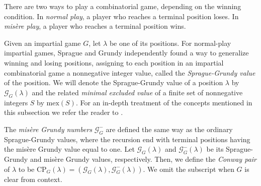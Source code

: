 \documentclass[pdflatex,sn-mathphys-num]{sn-jnl}%
\theoremstyle{thmstyleone}%
\theoremstyle{thmstyletwo}%
\theoremstyle{thmstylethree}%
\newcommand{\sg}{\mathcal{G}}
\newcommand{\cp}{\mathrm{CP}}
\begin{document}
There are two ways to play a combinatorial game, depending on the winning condition. In \emph{normal play}, a player who reaches a terminal position loses. In \emph{misère play}, a player who reaches a terminal position wins. 


Given an impartial game $G$, let  $\lambda$ be one of its positions.
For normal-play impartial games, Sprague \cite{Spr35} and Grundy \cite{Gru39} independently found a way to generalize winning and losing positions, assigning to each position in an impartial combinatorial game a nonnegative integer value, called the \emph{Sprague-Grundy value} of the position. We will denote the Sprague-Grundy value of a position $\lambda$ by $\sg_G(\lambda)$
and the related \emph{minimal excluded value} of a finite set of nonnegative integers $S$ by $\mathrm{mex}(S)$. For an in-depth treatment of the concepts mentioned in this subsection we refer the reader to \cite{Sie13}.

The \emph{mis\`ere Grundy numbers} $\mathcal G_G^-$ are defined the same way as the ordinary Sprague-Grundy values, where the recursion end with terminal positions having the mis\`ere Grundy value equal to one.
Let $\sg_G(\lambda)$ and $\mathcal G_G^-(\lambda)$ be its Sprague-Grundy and mis\`ere Grundy values, respectively.
Then, we define  the \emph{Conway pair} of $\lambda$ to be $\cp_G(\lambda) = (\sg_G(\lambda), \mathcal G_G^-(\lambda))$.
We omit the subscript when $G$ is clear from context.
\end{document}
